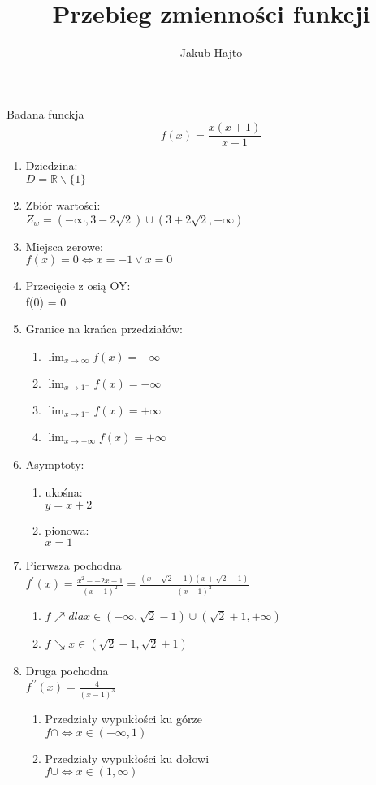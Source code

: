 \documentclass[11pt]{scrartcl}
\title{Przebieg zmienności funkcji}
\author{Jakub Hajto}
\begin{document}
	\maketitle
	\begin{center}
	Badana funckja $$ f(x) = \frac{x(x+1)}{x-1} $$
	\end{center}
	\begin{enumerate}  
		\item Dziedzina: \\
			$ D = \mathbb{R} \backslash \{1\} $
		\item Zbiór wartości: \\
			$ Z_w = (-\infty, 3 - 2\sqrt{2}) \cup (3 + 2\sqrt{2}, + \infty) $
		\item Miejsca zerowe: \\
			$ f(x) = 0 \Longleftrightarrow x = -1 \vee x = 0 $
		\item Przecięcie z osią OY: \\
			f(0) = 0
		\item Granice na krańca przedziałów:
			\begin{enumerate}
				\item $ \lim_{x\to\infty} f(x) = -\infty $
				\item $ \lim_{x\to1^-} f(x) = -\infty $
				\item $ \lim_{x\to1^-} f(x) = +\infty $
				\item $ \lim_{x\to+\infty} f(x) = +\infty $
			\end{enumerate}
		\item Asymptoty:
			\begin{enumerate}
				\item ukośna: \\
					$ y = x + 2$
				\item pionowa: \\
					$ x=1 $
			\end{enumerate}
		\item Pierwsza pochodna \\
			$ f^{\prime}(x) = \frac{x^2 - -2x -1}{(x-1)^2} =  \frac{(x- \sqrt{2} - 1)(x + \sqrt{2} - 1)}{(x-1)^2} $
			\begin{enumerate}
				\item $ f\nearrow dla x \in (-\infty, \sqrt{2} -1) \cup (\sqrt{2} +1, +\infty) $
				\item $ f\searrow x \in ( \sqrt{2} - 1, \sqrt{2} +1 ) $
			\end{enumerate}
		\item Druga pochodna \\
			$ f^{\prime\prime}(x) = \frac{4}{(x-1)^3} $
			\begin{enumerate}
				\item Przedziały wypukłości ku górze \\
				$ f\cap \Leftrightarrow x \in (-\infty, 1) $
				\item Przedziały wypukłości ku dołowi \\
				$ f\cup \Leftrightarrow x \in (1,\infty) $
			\end{enumerate}
	\end{enumerate}
	
\end{document}
